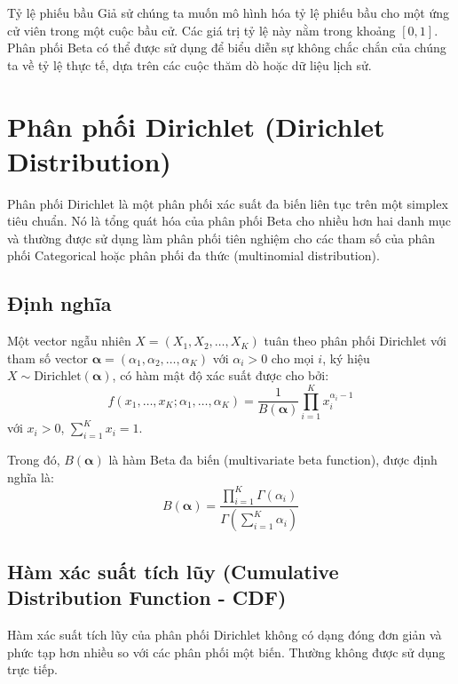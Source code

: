 		Tỷ lệ phiếu bầu
		Giả sử chúng ta muốn mô hình hóa tỷ lệ phiếu bầu cho một ứng cử viên trong một cuộc bầu cử. Các giá trị tỷ lệ này nằm trong khoảng $[0, 1]$. Phân phối Beta có thể được sử dụng để biểu diễn sự không chắc chắn của chúng ta về tỷ lệ thực tế, dựa trên các cuộc thăm dò hoặc dữ liệu lịch sử.
	
\section{Phân phối Dirichlet (Dirichlet Distribution)}
	Phân phối Dirichlet là một phân phối xác suất đa biến liên tục trên một simplex tiêu chuẩn. Nó là tổng quát hóa của phân phối Beta cho nhiều hơn hai danh mục và thường được sử dụng làm phân phối tiên nghiệm cho các tham số của phân phối Categorical hoặc phân phối đa thức (multinomial distribution).
	
	\subsection{Định nghĩa}
		Một vector ngẫu nhiên $X = (X_1, X_2, \dots, X_K)$ tuân theo phân phối Dirichlet với tham số vector $\boldsymbol{\alpha} = (\alpha_1, \alpha_2, \dots, \alpha_K)$ với $\alpha_i > 0$ cho mọi $i$, ký hiệu $X \sim \text{Dirichlet}(\boldsymbol{\alpha})$, có hàm mật độ xác suất được cho bởi:
		\[ f(x_1, \dots, x_K; \alpha_1, \dots, \alpha_K) = \frac{1}{B(\boldsymbol{\alpha})} \prod_{i=1}^K x_i^{\alpha_i-1} \]
		với $x_i > 0$, $\sum_{i=1}^K x_i = 1$.
		
		Trong đó, $B(\boldsymbol{\alpha})$ là hàm Beta đa biến (multivariate beta function), được định nghĩa là:
		\[ B(\boldsymbol{\alpha}) = \frac{\prod_{i=1}^K \Gamma(\alpha_i)}{\Gamma\left(\sum_{i=1}^K \alpha_i\right)} \]
	
	\subsection{Hàm xác suất tích lũy (Cumulative Distribution Function - CDF)}
	Hàm xác suất tích lũy của phân phối Dirichlet không có dạng đóng đơn giản và phức tạp hơn nhiều so với các phân phối một biến. Thường không được sử dụng trực tiếp.
	
